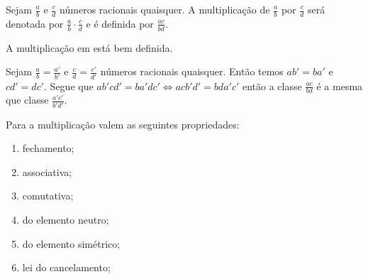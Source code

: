 \documentclass[../main.tex]{subfiles}
\begin{document}
\begin{defi}
    Sejam $\frac{a}{b}$ e $\frac{c}{d}$ números racionais quaisquer. A multiplicação de $\frac{a}{b}$ por $\frac{c}{d}$ será denotada por $\frac{a}{b} \cdot \frac{c}{d}$ e é definida por $\frac{ac}{bd}$.
\end{defi}
\begin{prop}
    A multiplicação em \Q está bem definida.
\end{prop}
\begin{dem}
    Sejam $\frac{a}{b} = \frac{a'}{b'}$ e $\frac{c}{d} = \frac{c'}{d'}$ números racionais quaisquer. Então temos $ab' = ba'$ e $cd' = dc'$. Segue que $ab'cd' = ba'dc' \iff acb'd' = bda'c'$ então a classe $\frac{ac}{bd}$ é a mesma que classe $\frac{a'c'}{b'd'}$.
\end{dem}
\begin{prop}{Para a multiplicação valem as seguintes propriedades:}
    \begin{enumerate}[label=(\roman*)]
        \item fechamento;
        \item associativa;
        \item comutativa;
        \item do elemento neutro; 
        \item do elemento simétrico;
        \item lei do cancelamento;
    \end{enumerate}
\end{prop}
\end{document}
